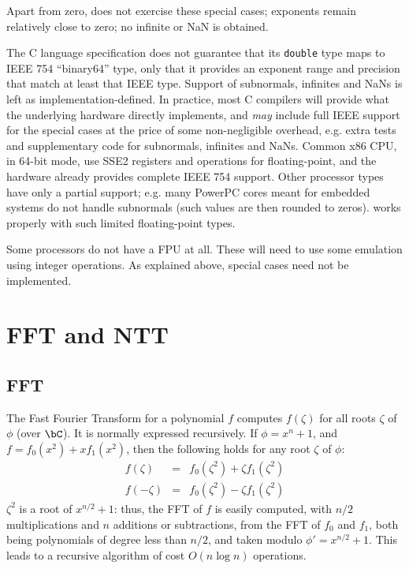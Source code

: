 Apart from zero, \falcon does not exercise these special cases; exponents
remain relatively close to zero; no infinite or NaN is obtained.

The C language specification does not guarantee that its \verb+double+
type maps to IEEE 754 ``binary64'' type, only that it provides an
exponent range and precision that match at least that IEEE type. Support
of subnormals, infinites and NaNs is left as implementation-defined. In
practice, most C compilers will provide what the underlying hardware
directly implements, and \emph{may} include full IEEE support for the
special cases at the price of some non-negligible overhead, e.g. extra
tests and supplementary code for subnormals, infinites and NaNs. Common
x86 CPU, in 64-bit mode, use SSE2 registers and operations for
floating-point, and the hardware already provides complete IEEE 754
support. Other processor types have only a partial support; e.g. many
PowerPC cores meant for embedded systems do not handle subnormals (such
values are then rounded to zeros). \falcon works properly with such
limited floating-point types.

Some processors do not have a FPU at all. These will need to use
some emulation using integer operations. As explained above, special
cases need not be implemented.

\section{FFT and NTT}

\subsection{FFT}


The Fast Fourier Transform for a polynomial $f$ computes $f(\zeta)$
for all roots $\zeta$ of $\phi$ (over $\bC$). It is normally expressed
recursively. If $\phi = x^n+1$, and $f = f_0(x^2) + xf_1(x^2)$, then
the following holds for any root $\zeta$ of $\phi$:
\begin{equation}
  \begin{array}{rcl}
     f(\zeta) &=& f_0(\zeta^2) + \zeta f_1(\zeta^2) \\
     f(-\zeta) &=& f_0(\zeta^2) - \zeta f_1(\zeta^2)
  \end{array}
\end{equation}
$\zeta^2$ is a root of $x^{n/2}+1$: thus, the FFT of $f$ is easily
computed, with $n/2$ multiplications and $n$ additions or subtractions,
from the FFT of $f_0$ and $f_1$, both being polynomials of degree less
than $n/2$, and taken modulo $\phi' = x^{n/2}+1$. This leads to a
recursive algorithm of cost $O(n \log n)$ operations.

